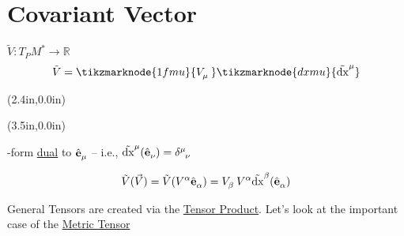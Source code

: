 \documentclass{article}
\begin{document}
\section*{Covariant Vector}
$\tilde{V} : T_P M^* \rightarrow \mathbb{R}$
\begin{equation*}
    \tilde{V} = \tikzmarknode{1fmu}{\tensor{V}{_\mu}} \tikzmarknode{dxmu}{\tensor{\tilde{\mathrm{dx}}}{^\mu}}
\end{equation*}
{%
\begin{textblock*}{1in}(2.4in,0.0in)%
\begin{minipage}[h!]{1in}
\end{minipage}%
\end{textblock*}%
}%
{%
\begin{textblock*}{3in}(3.5in,0.0in)%
\begin{minipage}[h!]{3in}
    -form \underline{dual} to $\tensor{\hat{\mathbf{e}}}{_\mu}$ -- i.e., $\tensor{\tilde{\mathrm{dx}}}{^\mu} ( \tensor{\hat{\mathbf{e}}}{_\nu} ) = \tensor{\delta}{^\mu_\nu} $
\end{minipage}%
\end{textblock*}%
}

\vspace{-24pt} \begin{equation*}
    \tilde{V} (\vec{V}) = \tilde{V} ( \tensor{V}{^\alpha} \tensor{\hat{\mathbf{e}}}{_\alpha} ) = \tensor{V}{_\beta} \tensor{V}{^\alpha} \tensor{\tilde{\mathrm{dx}}}{^\beta} ( \tensor{\hat{\mathbf{e}}}{_\alpha} )
\end{equation*}

\noindent General Tensors are created via the \underline{Tensor Product}. Let's look at the important case of the \underline{Metric Tensor}
\end{document}

